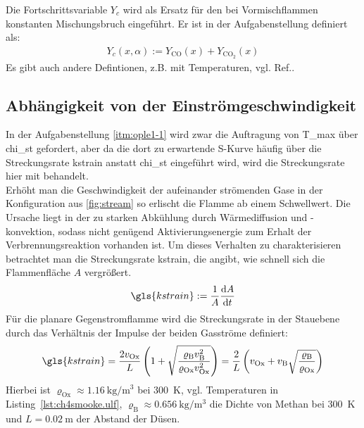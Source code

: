 Die Fortschrittsvariable $Y_c$ wird als Ersatz für den bei Vormischflammen konstanten Mischungsbruch eingeführt. Er ist in der Aufgabenstellung definiert als:
\begin{align}
    \label{eq:pv}
    Y_c(x,\alpha) := Y_\mathrm{CO} (x) + Y_{\mathrm{CO}_2} (x)
\end{align}
Es gibt auch andere Defintionen, z.B. mit Temperaturen, vgl. Ref.\cite[45]{poinsot2005theoretical}.



\subsection{Abhängigkeit von der Einströmgeschwindigkeit}
\label{sct:skurve}

In der Aufgabenstellung \ref{itm:ople1-1} wird zwar die Auftragung von \gls{T_max} über \gls{chi_st} gefordert, aber da die dort zu erwartende S-Kurve häufig über die Streckungsrate \gls{kstrain} anstatt \gls{chi_st} eingeführt wird, wird die Streckungsrate hier mit behandelt.\\

Erhöht man die Geschwindigkeit der aufeinander strömenden Gase in der Konfiguration aus \autoref{fig:stream} so erlischt die Flamme ab einem Schwellwert. Die Ursache liegt in der zu starken Abkühlung durch Wärmediffusion und -konvektion, sodass nicht genügend Aktivierungsenergie zum Erhalt der Verbrennungsreaktion vorhanden ist. Um dieses Verhalten zu charakterisieren betrachtet man die Streckungsrate \gls{kstrain}, die angibt, wie schnell sich die Flammenfläche $A$ vergrößert.
\begin{align}
    \gls{kstrain}
    := \frac{1}{A} \ftdif{A}{t}
\end{align}
Für die planare Gegenstromflamme wird die Streckungsrate in der Stauebene durch das Verhältnis der Impulse der beiden Gasströme definiert\cite{seshadri1978}\cite{fisher1997determination}:
\begin{align}
    \label{eq:kstrain}
    \gls{kstrain}
    = \frac{2 v_\mathrm{Ox}}{L} \left( 1 +
        \sqrt{ \frac{ \varrho_\mathrm{B} v_\mathrm{B}^2 }
        { \varrho_\mathrm{Ox} v_\mathrm{Ox}^2 } } \right)
    = \frac{2}{L} \left( v_\mathrm{Ox} + v_\mathrm{B}
      \sqrt{ \frac{ \varrho_\mathrm{B} }{ \varrho_\mathrm{Ox} } } \right)
\end{align}
Hierbei ist $\varrho_\mathrm{Ox} \approx \SI{1.16}{\kilo\gram\per\cubic\meter}$ bei \SI{300}{\kelvin}, vgl. Temperaturen in Listing~\ref{lst:ch4smooke.ulf}, $\varrho_\mathrm{B} \approx \SI{0.656}{\kilo\gram\per\cubic\meter}$ die Dichte von Methan bei \SI{300}{\kelvin} und $L=\SI{0.02}{\meter}$ der Abstand der Düsen.\\

